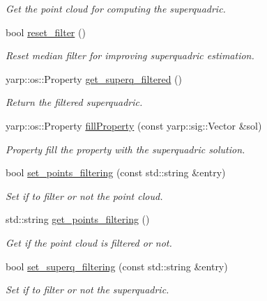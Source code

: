 \begin{DoxyCompactItemize}
\begin{DoxyCompactList}\small\item\em Get the point cloud for computing the superquadric. \end{DoxyCompactList}\item 
bool \hyperlink{classSuperqModule_ae234e2b5b715e64ef928905964660122}{reset\-\_\-filter} ()
\begin{DoxyCompactList}\small\item\em Reset median filter for improving superquadric estimation. \end{DoxyCompactList}\item 
yarp\-::os\-::\-Property \hyperlink{classSuperqModule_aa6825617672381dcf3eb81dc643f0aaa}{get\-\_\-superq\-\_\-filtered} ()
\begin{DoxyCompactList}\small\item\em Return the filtered superquadric. \end{DoxyCompactList}\item 
yarp\-::os\-::\-Property \hyperlink{classSuperqModule_ae2935a960968a6354462a728e16d60b0}{fill\-Property} (const yarp\-::sig\-::\-Vector \&sol)
\begin{DoxyCompactList}\small\item\em Property fill the property with the superquadric solution. \end{DoxyCompactList}\item 
bool \hyperlink{classSuperqModule_a408203d0119443fb61544f84dafff8a4}{set\-\_\-points\-\_\-filtering} (const std\-::string \&entry)
\begin{DoxyCompactList}\small\item\em Set if to filter or not the point cloud. \end{DoxyCompactList}\item 
std\-::string \hyperlink{classSuperqModule_a60c8ff17436cc55a3e9b704dd6c2529b}{get\-\_\-points\-\_\-filtering} ()
\begin{DoxyCompactList}\small\item\em Get if the point cloud is filtered or not. \end{DoxyCompactList}\item 
bool \hyperlink{classSuperqModule_a902d4a48d1a919ff9d9b1f7d1c132577}{set\-\_\-superq\-\_\-filtering} (const std\-::string \&entry)
\begin{DoxyCompactList}\small\item\em Set if to filter or not the superquadric. \end{DoxyCompactList}\item 

\end{DoxyCompactItemize}
